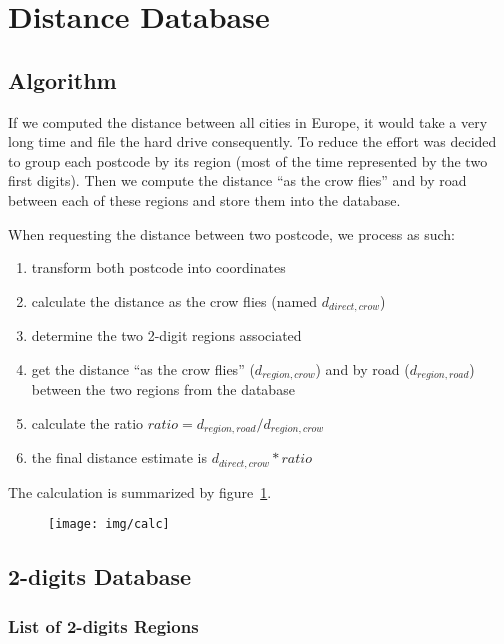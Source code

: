 
\section{Distance Database}

\subsection{Algorithm}\label{distance_algorithm}

If we computed the distance between all cities in Europe, it would take a very
long time and file the hard drive consequently.
To reduce the effort was decided to group each postcode by its region (most of the
time represented by the two first digits). Then we compute the distance ``as the
crow flies'' and by road between each of these regions and store them into the database.

When requesting the distance between two postcode, we process as such:
\begin{enumerate}
  \item transform both postcode into coordinates
  \item calculate the distance as the crow flies (named $d_{direct,crow}$)
  \item determine the two 2-digit regions associated
  \item get the distance ``as the crow flies'' ($d_{region,crow}$) and by road
      ($d_{region,road}$) between the two regions from the database
  \item calculate the ratio $ratio = d_{region,road}/d_{region,crow}$
  \item the final distance estimate is $d_{direct,crow} * ratio$
\end{enumerate}

The calculation is summarized by figure~\ref{fig:calc}.
\begin{figure}[H]
\centering
\texttt{[image: img/calc]}
\label{fig:calc}
\end{figure}

\subsection{2-digits Database}

\subsubsection{List of 2-digits Regions}


